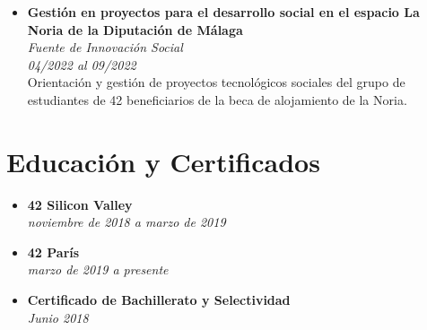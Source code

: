 \documentclass[11pt, oneside, a4paper, titlepage]{article}
\begin{document}
\begin{tcolorbox}
\begin{minipage}[t]{11cm}
\begin{tcolorbox}[grow to right
		by=0.75cm,colframe=white,colback=white]
\begin{itemize}
{					Gestión de picos de hasta 160 alumnos y los 300 imacs
					a disposición de estos en el espacio de trabajo.
				}
				\item {
					\textbf{Gestión en proyectos para el desarrollo
						social en el espacio La Noria de la Diputación de
						Málaga} \\
					\emph{Fuente de Innovación Social} \\
					\emph{04/2022 al 09/2022} \\
					Orientación y gestión de proyectos tecnológicos
					sociales del grupo de estudiantes de 42 beneficiarios de la
					beca de alojamiento de la Noria.
				}
			\end{itemize}
			
			\section{Educación y Certificados}
			\begin{itemize}
				\item
				{
					\textbf{42 Silicon Valley } \\
					\emph{noviembre de 2018 a  marzo de 2019} \\
				}
				\item
				{
					\textbf{42 París} \\
					\emph{marzo de 2019 a presente} \\
				}
				\item
				{
					\textbf{Certificado de Bachillerato y Selectividad} \\
					\emph{Junio 2018} \\
				}
			\end{itemize}
		\end{tcolorbox}
	\end{minipage}
\end{tcolorbox}
\end{document}
